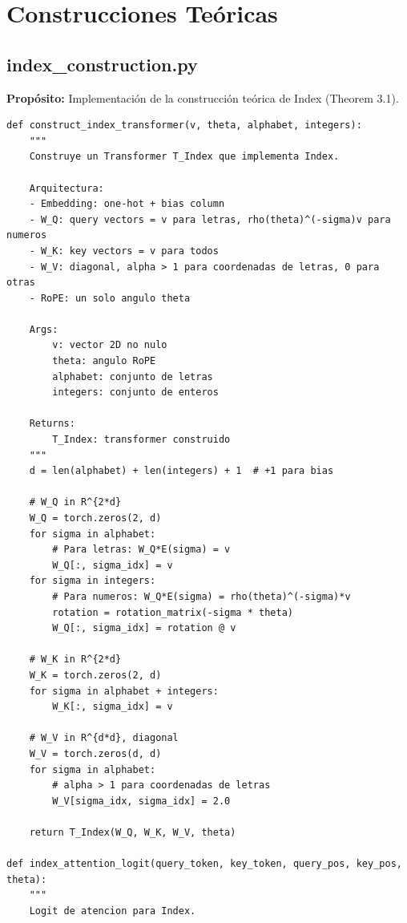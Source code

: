 \documentclass[12pt,a4paper]{report}
\begin{document}
\section{Construcciones Teóricas}
\label{sec:construcciones}

\subsection{index\_construction.py}
\label{subsec:index_construction}

\textbf{Propósito:} Implementación de la construcción teórica de Index (Theorem 3.1).

\begin{lstlisting}
def construct_index_transformer(v, theta, alphabet, integers):
    """
    Construye un Transformer T_Index que implementa Index.
    
    Arquitectura:
    - Embedding: one-hot + bias column
    - W_Q: query vectors = v para letras, rho(theta)^(-sigma)v para numeros
    - W_K: key vectors = v para todos
    - W_V: diagonal, alpha > 1 para coordenadas de letras, 0 para otras
    - RoPE: un solo angulo theta
    
    Args:
        v: vector 2D no nulo
        theta: angulo RoPE
        alphabet: conjunto de letras
        integers: conjunto de enteros
    
    Returns:
        T_Index: transformer construido
    """
    d = len(alphabet) + len(integers) + 1  # +1 para bias
    
    # W_Q in R^{2*d}
    W_Q = torch.zeros(2, d)
    for sigma in alphabet:
        # Para letras: W_Q*E(sigma) = v
        W_Q[:, sigma_idx] = v
    for sigma in integers:
        # Para numeros: W_Q*E(sigma) = rho(theta)^(-sigma)*v
        rotation = rotation_matrix(-sigma * theta)
        W_Q[:, sigma_idx] = rotation @ v
    
    # W_K in R^{2*d}
    W_K = torch.zeros(2, d)
    for sigma in alphabet + integers:
        W_K[:, sigma_idx] = v
    
    # W_V in R^{d*d}, diagonal
    W_V = torch.zeros(d, d)
    for sigma in alphabet:
        # alpha > 1 para coordenadas de letras
        W_V[sigma_idx, sigma_idx] = 2.0
    
    return T_Index(W_Q, W_K, W_V, theta)

def index_attention_logit(query_token, key_token, query_pos, key_pos, theta):
    """
    Logit de atencion para Index.
    

\end{lstlisting}
\end{document}

